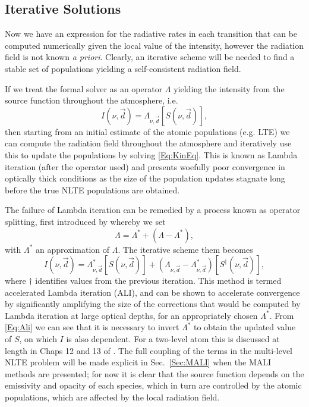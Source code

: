 \subsection{Iterative Solutions}

Now we have an expression for the radiative rates in each transition that can be computed numerically given the local value of the intensity, however the radiation field is not known \textit{a priori}.
Clearly, an iterative scheme will be needed to find a stable set of populations yielding a self-consistent radiation field.

If we treat the formal solver as an operator $\Lambda$ yielding the intensity from the source function throughout the atmosphere, i.e.
\begin{equation}
    I(\nu, \vec{d}) = \Lambda_{\nu,\vec{d}}[S(\nu, \vec{d})],
    \label{Eq:LambdaOperator}
\end{equation}
then starting from an initial estimate of the atomic populations (e.g. LTE) we can compute the radiation field throughout the atmosphere and iteratively use this to update the populations by solving \eqref{Eq:KinEq}. This is known as Lambda iteration (after the operator used) and presents woefully poor convergence in optically thick conditions as the size of the population updates stagnate long before the true NLTE populations are obtained.

The failure of Lambda iteration can be remedied by a process known as operator splitting, first introduced by \citet{Cannon1973} whereby we set
\begin{equation}
    \Lambda = \Lambda^* + (\Lambda - \Lambda^*),
\end{equation}
with $\Lambda^*$ an approximation of $\Lambda$. The iterative scheme them becomes
\begin{equation}
    I(\nu, \vec{d}) = \Lambda_{\nu, \vec{d}}^*[S(\nu, \vec{d})] + (\Lambda_{\nu, \vec{d}} - \Lambda_{\nu, \vec{d}}^*)[S^{\dagger}(\nu, \vec{d})],
    \label{Eq:Ali}
\end{equation}
where $\dagger$ identifies values from the previous iteration. This method is termed accelerated Lambda iteration (ALI), and can be shown to accelerate convergence by significantly amplifying the size of the corrections that would be computed by Lambda iteration at large optical depths, for an appropriately chosen $\Lambda^*$.
From \eqref{Eq:Ali} we can see that it is necessary to invert $\Lambda^*$ to obtain the updated value of $S$, on which $I$ is also dependent.
For a two-level atom this is discussed at length in Chaps 12 and 13 of \citet{Hubeny2014}.
The full coupling of the terms in the multi-level NLTE problem will be made explicit in Sec.~\ref{Sec:MALI} when the MALI methods are presented; for now it is clear that the source function depends on the emissivity and opacity of each species, which in turn are controlled by the atomic populations, which are affected by the local radiation field.

